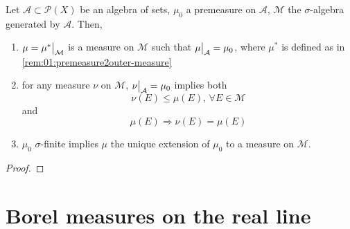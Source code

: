\begin{thm}\label{thm:1.14}
  Let ${\mathcal{A}\subset\mathscr{P}(X)}$ be an algebra of sets,
  $\mu_0$ a premeasure on $\mathcal{A}$,
  $\mathcal{M}$ the $\sigma$-algebra generated by $\mathcal{A}$.
  Then,
  \begin{enumerate}
  \item
    ${\mu = \restr{\mu^*}{\mathcal{M}}}$ is a measure on $\mathcal{M}$
    such that ${\restr{\mu}{\mathcal{A}}=\mu_0}$,
    where $\mu^*$ is defined as in \ref{rem:01:premeasure2outer-measure}
  \item
    for any measure $\nu$ on $\mathcal{M}$,
    ${\restr{\nu}{\mathcal{A}}=\mu_0}$ implies both
    \[ \nu(E)\leq\mu(E),\,\forall E\in\mathcal{M} \]
    and
    \[ \mu(E)\Rightarrow \nu(E)=\mu(E) \]
  \item
    $\mu_0$ $\sigma$-finite implies
    $\mu$ the unique extension of $\mu_0$ to a measure on $\mathcal{M}$.
  \end{enumerate}
\end{thm}
\begin{proof}
\end{proof}

\section{Borel measures on the real line}
